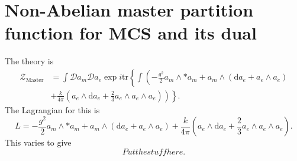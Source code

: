 \documentclass{article}
\begin{document}
\section{Non-Abelian master partition function for MCS and its dual}
The theory is
\begin{align}
    \label{Eq: Master equation}
    \mathcal{Z}_{\text{Master}}&= \int \mathcal{D}a_{m}\mathcal{D}a_{e}\exp i \text{tr}\left\{\int \left(-\frac{g^{2}}{2}a_{m}\wedge * a_{m} \right.\right. + a_{m}\wedge \left(\mathrm{d}a_{e} + a_{e}\wedge a_{e} \right) \nonumber \\
    &+ \left.\left.\frac{k}{4\pi}\left(a_{e}\wedge \mathrm{d}a_{e} + \frac{2}{3}a_{e}\wedge a_{e}\wedge a_{e} \right)\right)\right\}.
\end{align}
The Lagrangian for this is
\begin{equation}
    L = -\frac{g^{2}}{2}a_{m}\wedge * a_{m}  + a_{m}\wedge \left(\mathrm{d}a_{e} + a_{e}\wedge a_{e} \right)+ \frac{k}{4\pi}\left(a_{e}\wedge \mathrm{d}a_{e} + \frac{2}{3}a_{e}\wedge a_{e}\wedge a_{e} \right).
\end{equation}
This varies to give
\begin{equation}
    Put the stuff here.
\end{equation}
\end{document}
